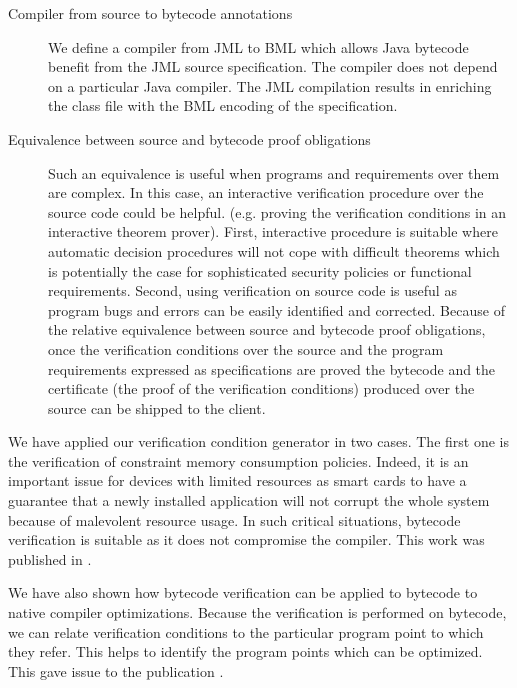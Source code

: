\begin{description}
 

   \item [Compiler from source to bytecode annotations]
         We define a compiler from JML to BML which  
	 allows Java  bytecode benefit from the JML source specification.
	 The compiler does not depend on a particular Java compiler.
	 The JML compilation results in enriching the class file with the BML
	 encoding of the specification.
	 
    \item[Equivalence between source and bytecode proof obligations] Such an equivalence is useful when programs and requirements over them are complex.
         In this case, an interactive verification procedure over the source code  could be helpful.
	 (e.g. proving the verification conditions in an interactive theorem prover).
	 First, interactive  procedure is suitable where automatic decision procedures will not cope with
	 difficult theorems which is potentially the case for sophisticated security policies or functional requirements. 
	 Second, using verification on source code is useful as program bugs and errors can be easily identified and corrected.
	 Because of the relative equivalence between source and bytecode proof obligations, 
	 once the verification conditions over the source and the program requirements expressed as specifications are
	 proved the bytecode and the certificate (the proof of the verification conditions) produced over the source
	 can be shipped  to the client.


\end{description}


We have applied our verification condition generator in two cases. The first one is the verification of constraint memory consumption policies.
 Indeed, it is an important issue for devices with limited resources as smart cards to have a guarantee that a newly installed application 
will not corrupt the whole system because of malevolent resource usage. In such critical situations, bytecode verification is suitable
as it does not compromise the compiler. This work was published in \cite{gmg05:sefm}.


We have also shown how bytecode verification can be applied to  bytecode to native compiler optimizations. Because the verification is performed
on bytecode, we can relate verification conditions to the particular program point to which they refer. This helps to identify
the program points which can be optimized. This gave issue to the publication \cite{DBLP:conf/cardis/CourbotPGV06}. 
	 

